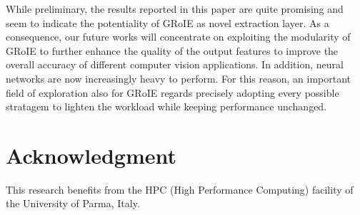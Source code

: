 \documentclass[10pt,conference,a4paper]{IEEEtran}
\begin{document}
While preliminary, the results reported in this paper are quite promising and seem to indicate the potentiality of GRoIE as novel extraction layer. 
As a consequence, our future works will concentrate on exploiting the modularity of GRoIE to further enhance the quality of the output features to improve the overall accuracy of different computer vision applications.
In addition, neural networks are now increasingly heavy to perform.
For this reason, an important field of exploration also for GRoIE regards precisely adopting every possible stratagem to lighten the workload while keeping performance unchanged.
 












\section*{Acknowledgment}

This research benefits from the HPC (High Performance Computing) facility of
the University of Parma, Italy.





\end{document}
